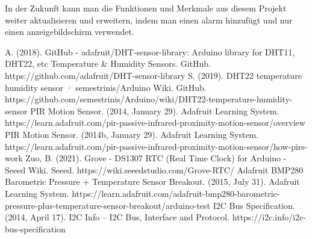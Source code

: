 \documentclass[conference]{IEEEtran}
\begin{document}
In der Zukunft kann man die Funktionen und Merkmale aus diesem Projekt weiter aktualisieren und erweitern, indem man einen alarm hinzufügt und nur einen anzeigebildschirm verwendet.

\begin{thebibliography}{00}
 A. (2018). GitHub - adafruit/DHT-sensor-library: Arduino library for DHT11, DHT22, etc Temperature \& Humidity Sensors. GitHub. https://github.com/adafruit/DHT-sensor-library
 S. (2019). DHT22 temperature humidity sensor · semestrinis/Arduino Wiki. GitHub. https://github.com/semestrinis/Arduino/wiki/DHT22-temperature-humidity-sensor
 PIR Motion Sensor. (2014, January 29). Adafruit Learning System. https://learn.adafruit.com/pir-passive-infrared-proximity-motion-sensor/overview
 PIR Motion Sensor. (2014b, January 29). Adafruit Learning System. https://learn.adafruit.com/pir-passive-infrared-proximity-motion-sensor/how-pirs-work
 Zuo, B. (2021). Grove - DS1307 RTC (Real Time Clock) for Arduino - Seeed Wiki. Seeed. https://wiki.seeedstudio.com/Grove-RTC/
 Adafruit BMP280 Barometric Pressure + Temperature Sensor Breakout. (2015, July 31). Adafruit Learning System. https://learn.adafruit.com/adafruit-bmp280-barometric-pressure-plus-temperature-sensor-breakout/arduino-test
 I2C Bus Specification. (2014, April 17). I2C Info – I2C Bus, Interface and Protocol. https://i2c.info/i2c-bus-specification
\end{thebibliography}
\vspace{12pt}
\end{document}
